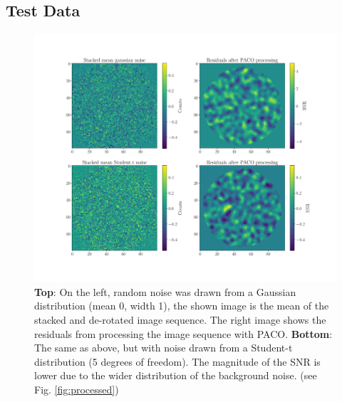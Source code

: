 \documentclass[twocolumn,fleqn]{aastex62}
\begin{document}
\subsection{Test Data}
\begin{figure}[h]
	\hspace{-3.5em}
	\includegraphics[width=1.25\linewidth]{beforeafter_3}
	\caption{\label{fig:noise} \textbf{Top}: On the left, random noise was drawn from a Gaussian distribution (mean 0, width 1), the shown image is the mean of the stacked and de-rotated image sequence. 
		The right image shows the residuals from processing the image sequence with PACO.
		\textbf{Bottom}: The same as above, but with noise drawn from a Student-t distribution (5 degrees of freedom). The magnitude of the SNR is lower due to the wider distribution of the background noise. (see Fig. \ref{fig:processed})}
\end{figure}
\end{document}
